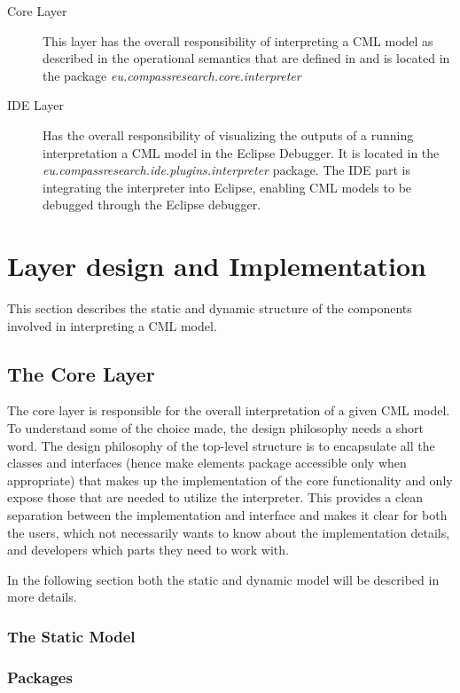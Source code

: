 \documentclass[a4paper, 10pt]{include/compassreport}   %
\begin{document}
\begin{description}
\item[Core Layer] This layer has the overall responsibility of interpreting a CML model
as described in the operational semantics that are defined in
\cite{Bryans&12} and is located in the package
\emph{eu.compassresearch.core.interpreter}

\item[IDE Layer] Has the overall responsibility of visualizing the outputs of a running
interpretation a CML model in the Eclipse Debugger. It is located in
the \emph{eu.compassresearch.ide.plugins.interpreter} package.  The
IDE part is integrating the interpreter into Eclipse, enabling CML
models to be debugged through the Eclipse
debugger. 

\end{description}

\section{Layer design and Implementation}
This section describes the static and dynamic structure of the
components involved in interpreting a CML model.

\subsection{The Core Layer}
The core layer is responsible for the overall interpretation of a
given CML model. To understand some of the choice made, the design
philosophy needs a short word. The design philosophy of the top-level
structure is to encapsulate all the classes and interfaces (hence make
elements package accessible only when appropriate) that makes up the
implementation of the core functionality and only expose those that
are needed to utilize the interpreter. This provides a clean
separation between the implementation and interface and makes it clear
for both the users, which not necessarily wants to know about the
implementation details, and developers which parts they need to work
with. 

In the following section both the static and dynamic
model will be described in more details.

\subsubsection{The Static Model}
\label{sec:static_structure}

\subsubsection*{Packages}
\end{document}
